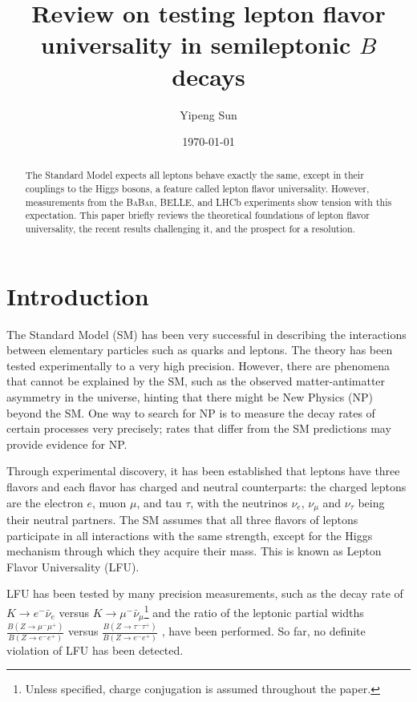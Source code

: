 \documentclass[12pt,letterpaper]{article}
\title{Review on testing lepton flavor universality in semileptonic $B$ decays}
\author{Yipeng Sun}
\affil{Department of Physics, University of Maryland}
\date{\today}
\def\BaBar/{\textsc{BaBar}}
\begin{document}
\maketitle

\begin{abstract}
    The Standard Model expects all leptons behave exactly the same, except in
    their couplings to the Higgs bosons, a feature called lepton flavor
    universality.
    However, measurements from the \BaBar/, BELLE, and LHCb experiments show
    tension with this expectation.
    This paper briefly reviews the theoretical foundations of lepton flavor
    universality, the recent results challenging it, and the prospect for a
    resolution.
\end{abstract}

\section{Introduction}
The Standard Model (SM) has been very successful in describing the interactions
between elementary particles such as quarks and leptons.
The theory has been tested experimentally to a very high precision.
However, there are phenomena that cannot be explained by the SM, such as
the observed matter-antimatter asymmetry in the universe, hinting that there
might be New Physics (NP) beyond the SM.
One way to search for NP is to measure the decay rates of certain processes
very precisely;
rates that differ from the SM predictions may provide evidence for NP.

Through experimental discovery, it has been established that leptons have three
flavors and each flavor has charged and neutral counterparts:
the charged leptons are the electron $e$, muon $\mu$, and tau $\tau$,
with the neutrinos $\nu_e$, $\nu_\mu$ and $\nu_\tau$ being their neutral
partners.
The SM assumes that all three flavors of leptons participate in all
interactions with the same strength, except for the Higgs mechanism through
which they acquire their mass.
This is known as Lepton Flavor Universality (LFU).

LFU has been tested by many precision measurements, such as the decay rate
of $K \rightarrow e^- \bar{\nu}_e$ versus
$K \rightarrow \mu^- \bar{\nu}_\mu$\footnote{
    Unless specified, charge conjugation is assumed throughout the paper.
} \cite{Ciezarek:2017yzh} and the ratio of the leptonic partial widths
$\frac{B(Z \rightarrow \mu^- \mu^+)}{B(Z \rightarrow e^- e^+)}$ versus
$\frac{B(Z \rightarrow \tau^- \tau^+)}{B(Z \rightarrow e^- e^+)}$
\cite{ALEPH:2005ab}, have been performed.
So far, no definite violation of LFU has been detected.
\end{document}

